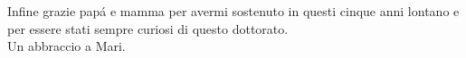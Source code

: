 \begin{acknowledgements}
Infine grazie pap\'a e mamma per avermi sostenuto in questi cinque anni lontano e per essere stati sempre curiosi di questo dottorato.\\
Un abbraccio a Mari.






















































\vspace{1cm}



\end{acknowledgements}
